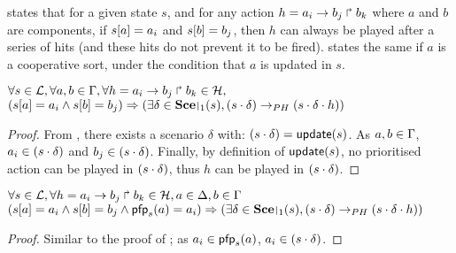  states that for a given state $s$, and for any action $h = a_i\rightarrow b_j\Rsh b_k$ where $a$ and $b$ are components,
if ${s[a]} = a_i$ and ${s[b]} = b_j$, then
$h$ can always be played after a series of hits (and these hits do not prevent it to be fired).
 states the same if $a$ is a cooperative sort, under the condition that $a$ is updated in $s$.
\begin{theorem}
\label{th:hcompcomp}
  $\forall s \in \mathcal{L}, \forall a,b \in \Gamma, \forall h = a_i\rightarrow b_j\Rsh b_k \in \mathcal{H},$\\
  $(\PHget{s}{a} = a_i \wedge \PHget{s}{b} = b_j) \Rightarrow (\exists \delta \in \restriction{\Sce}{1}(s),
  (s \PHplay \delta) \PHPtrans (s \PHplay \delta \PHplay h))$
\end{theorem}
\begin{proof}
  From , there exists a scenario $\delta$ with: $(s \cdot \delta) = \mathsf{update}(s)$.
  As $a,b \in \Gamma$, $a_i \in (s \cdot \delta)$ and $b_j \in (s \cdot \delta)$.
  Finally, by definition of $\mathsf{update}(s)$, no prioritised action can be played in $(s \cdot \delta)$, thus $h$ can be played in $(s \cdot \delta)$.
\end{proof}
\begin{theorem}
\label{th:hcscomp}
  $\forall s \in \mathcal{L}, \forall h = a_i\rightarrow b_j\Rsh b_k \in \mathcal{H}, a \in \Delta, b \in \Gamma$\\
  $(\PHget{s}{a} = a_i \wedge \PHget{s}{b} = b_j \wedge \pfp_s(a) = a_i) \Rightarrow (\exists \delta \in \restriction{\Sce}{1}(s),
  (s \PHplay \delta) \PHPtrans (s \PHplay \delta \PHplay h))$
\end{theorem}
\begin{proof}
  Similar to the proof of ;
  as $a_i \in \mathsf{pfp}_s(a)$, $a_i \in (s \cdot \delta)$.
\end{proof}
